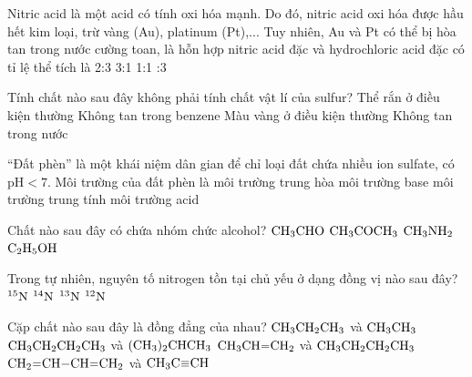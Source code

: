 \documentclass[11pt,a4paper]{article}
\begin{document}
\begin{ex}
Nitric acid là một acid có tính oxi hóa mạnh. Do đó, nitric acid oxi hóa được hầu hết kim loại, trừ vàng (Au), platinum (Pt),... Tuy nhiên, Au và Pt có thể bị hòa tan trong nước cường toan, là hỗn hợp nitric acid đặc và hydrochloric acid đặc có tỉ lệ thể tích là
\choice
{2:3}
{3:1}
{1:1}
{:3}

\end{ex}
\begin{ex}
Tính chất nào sau đây không phải tính chất vật lí của sulfur?
\choice
{Thể rắn ở điều kiện thường}
{\True Không tan trong benzene}
{Màu vàng ở điều kiện thường}
{Không tan trong nước}

\end{ex}
\begin{ex}
``Đất phèn'' là một khái niệm dân gian để chỉ loại đất chứa nhiều ion sulfate, có $\text{pH} < 7$. Môi trường của đất phèn là
\choice
{môi trường trung hòa}
{môi trường base}
{môi trường trung tính}
{\True môi trường acid}

\end{ex}
\begin{ex}
Chất nào sau đây có chứa nhóm chức alcohol?
\choice
{$\ce{CH3CHO}$}
{$\ce{CH3COCH3}$}
{$\ce{CH3NH2}$}
{\True $\ce{C2H5OH}$}

\end{ex}
\begin{ex}
Trong tự nhiên, nguyên tố nitrogen tồn tại chủ yếu ở dạng đồng vị nào sau đây?
\choice
{$^{15}\ce{N}$}
{\True $^{14}\ce{N}$}
{$^{13}\ce{N}$}
{$^{12}\ce{N}$}

\end{ex}
\begin{ex}
Cặp chất nào sau đây là đồng đẳng của nhau?
\choice
{\True $\ce{CH3CH2CH3}$ và $\ce{CH3CH3}$}
{$\ce{CH3CH2CH2CH3}$ và $\ce{(CH3)2CHCH3}$}
{$\ce{CH3CH=CH2}$ và $\ce{CH3CH2CH2CH3}$}
{$\ce{CH2=CH-CH=CH2}$ và $\ce{CH3C#CH}$}

\end{ex}
\end{document}
